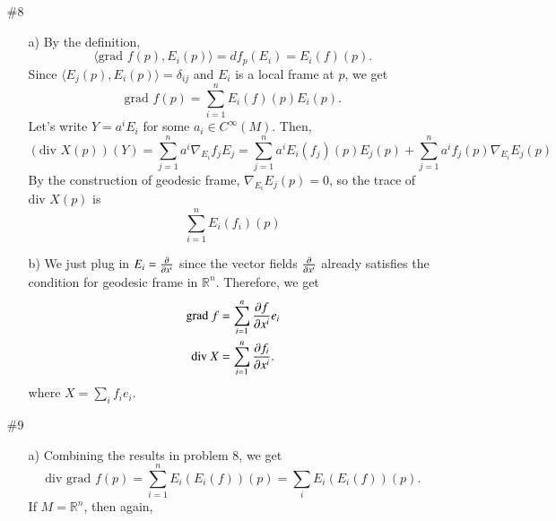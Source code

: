 \documentclass[a4paper, 12pt]{article}
\theoremstyle{Mydefinition}
\theoremstyle{Mytheorem}
\begin{document}
\begin{enumerate}
    \item[\#8] 
    \begin{enumerate}
        \item [a)] By the definition,
        \begin{equation}
            \langle \textrm{grad } f(p), E_i(p)\rangle = df_p(E_i) = E_i(f)(p).
        \end{equation}
        Since $\langle E_j(p), E_i(p)\rangle = \delta_{ij}$ and $E_i$ is a local frame at $p$, we get
        \begin{equation}
            \textrm{grad }f(p) = \sum_{i=1}^n E_i(f)(p)E_i(p).
        \end{equation} Let's write $Y = a^i E_i$ for some $a_i\in C^\infty(M)$. Then,
        \begin{equation}
            \left(\textrm{div } X(p)\right)(Y) = \sum_{j=1}^n a^i\nabla_{E_i}f_jE_j = \sum_{j=1}^n a^iE_i(f_j)(p)E_j(p) + \sum_{j=1}^n a^if_j(p)\nabla_{E_i}E_j(p)
        \end{equation}
        By the construction of geodesic frame, $\nabla_{E_i}E_j(p) = 0$, so the trace of $\textrm{div } X(p)$ is
        \begin{equation}
            \sum_{i=1}^n E_i(f_i)(p)
        \end{equation}
        \item[b)] We just plug in $E_i = \pdv{x^i}$ since the vector fields $\pdv{x^i}$ already satisfies the condition for geodesic frame in $\mathbb{R}^n$. Therefore, we get
        \begin{equation}
            \begin{split}
                \textrm{grad }f &= \sum_{i=1}^n \pdv{f}{x^i}e_i\\
                \textrm{div } X &= \sum_{i=1}^n \pdv{f_i}{x^i}.
            \end{split}
        \end{equation}
        where $X = \sum_i f_ie_i$.
    \end{enumerate}
    \item[\#9]
    \begin{enumerate}
        \item[a)] Combining the results in problem 8, we get
    \begin{equation}
        \textrm{div }\textrm{grad }f(p) = \sum_{i=1}^n E_i\left(E_i(f)\right)(p) = \sum_{i} E_i(E_i(f))(p).
    \end{equation}
    If $M=\mathbb{R}^n$, then again,
    \begin{equation}

\end{equation}
\end{enumerate}
\end{enumerate}
\end{document}
